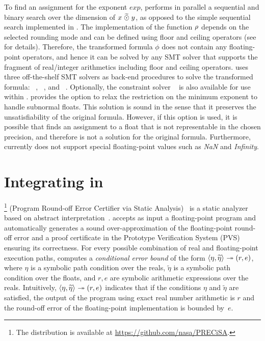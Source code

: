 \documentclass[runningheads,american,orivec,fleqn]{llncs}
\begin{document}
To find an assignment for the exponent $\mathit{exp}$, \smttool{} performs in parallel a sequential and binary search over the dimension of $x \mathrel{\widetilde{\odot}} y$, as opposed to the simple sequential search implemented in \Realizer{}.
%
The implementation of the function $\round{}$ depends on the selected rounding mode and can be defined using floor and ceiling operators (see \cite{LeeserMRW14} for details).
%
Therefore, the transformed formula $\phi$ does not contain any floating-point operators, and hence it can be solved by any SMT solver that supports the fragment of real/integer arithmetics including floor and ceiling operators.
%
\smttool{} uses three off-the-shelf SMT solvers as back-end procedures to solve the transformed formula: \Mathsat~\cite{CimattiGSS13}, \Zt~\cite{MouraB08}, and \CVCf~\cite{Barrett11}.
Optionally, the constraint solver \Colibri~\cite{MarreBC18} is also
available for use within \smttool{}.
% 
\smttool{} provides the option to relax the restriction on the minimum exponent to handle subnormal floats.
% 
This solution is sound in the sense that it preserves the unsatisfiability of the original formula.
% 
However, if this option is used, it is possible that \smttool{} finds an assignment to a float that is not representable in the chosen precision, and therefore is not a solution for the original formula.
%
Furthermore, \smttool{} currently does not support special floating-point values such as \emph{NaN} and \emph{Infinity}.

\section{Integrating \smttool{} in \tool}
\label{sec:precisa}
\tool{}\footnote{The \tool{} distribution is available at \url{https://github.com/nasa/PRECiSA}.} (Program Round-off Error Certifier via Static Analysis)~\cite{TitoloFMM18} is a static analyzer based on abstract interpretation~\cite{CousotC77}.
%
\tool{} accepts as input a floating-point program and automatically
generates a sound over-approximation of the floating-point round-off
error and a proof certificate in the Prototype Verification System (PVS)~\cite{OwreRS92} ensuring its correctness.
% 
For every possible combination of real and floating-point execution paths, \tool{} computes a \emph{conditional error bound} of the form $\langle \eta, \widetilde{\eta} \rangle_{} \twoheadrightarrow (r, e)^{}$, where
%
$\eta$ is a symbolic path condition over the reals,
$\widetilde{\eta}$ is a symbolic path condition over the floats,
and $r, e$ are symbolic arithmetic expressions over the reals.
%
Intuitively, $\langle \eta, \widetilde{\eta} \rangle_{} \twoheadrightarrow (r, e)^{}$ indicates that if the conditions $\eta$ and $\widetilde{\eta}$ are satisfied, the output of the program using exact real number arithmetic is $r$ and the round-off error of the floating-point implementation is bounded by~$e$.
%
\end{document}
